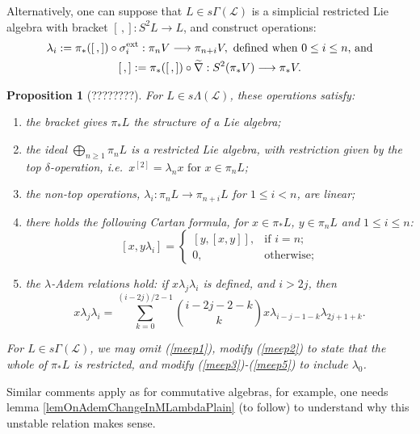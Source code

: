 \documentclass[11pt]{amsart}
\theoremstyle{plain}
\newtheorem{prop}[thm]{Proposition}
\theoremstyle{definition}
\renewcommand{\to}{\longrightarrow}
\newcommand{\scrL}{\mathscr{L}}
\theoremstyle{plain}
\newcommand{\LieOperad}{{\scrL}}
\newcommand{\restn}[1]{#1^{[2]}}
\begin{document}
\begin{Constructing homotopy and cohomotopy operations}
Alternatively, one can suppose that $L\in s \Gamma(\LieOperad)$ is a simplicial restricted Lie algebra with bracket $[\,,]:S^2L\to L$, and construct operations:
\begin{gather*}
\lambda_i:=\pi_*([\,,])\circ\sigma_i^\textup{ext}:\pi_nV\to \pi_{n+i}V,\textup{ defined when }0\leq i\leq n\textup{, and}\\
[\,,]:=\pi_*([\,,])\circ\widetilde{\nabla}:S^2(\pi_*V)\to \pi_{*}V.
\end{gather*}
\begin{prop}[????????]\label{omnibus on htpy of Lie algs}
For $L\in s\Lambda(\LieOperad)$, these operations satisfy:
\begin{enumerate}
\item \label{meep1} the bracket gives $\pi_*L$ the structure of a Lie algebra;
\item \label{meep2} the ideal $\bigoplus_{n\geq1}\pi_nL$ is a restricted Lie algebra, with restriction given by the \emph{top} $\delta$-operation, i.e.\ $\restn{x}=\lambda_nx\text{ for }x\in\pi_nL$;
\item \label{meep3} the \emph{non-top} operations, $\lambda_i:\pi_nL\to \pi_{n+i}L$ for $1\leq i<n$, are linear;
\item \label{meep4} there holds the following \emph{Cartan formula}, for $x\in \pi_*L$, $y\in \pi_nL$ and $1\leq i\leq n$:
\[[x,y\lambda_i]=\begin{cases}
[y,[x,y]],&\text{if }i=n;\\
0,&\text{otherwise};
\end{cases}
\]
\item \label{meep5} the \emph{$\lambda$-Adem relations} hold: if $x\lambda_j\lambda_i$ is defined, and $i>2j$, then
\[x\lambda_j\lambda_i=\sum_{k=0}^{(i-2j)/2-1}{i-2j-2-k\choose k}x\lambda_{i-j-1-k}\lambda_{2j+1+k}.\]
\end{enumerate}
For $L\in s\Gamma(\LieOperad)$, we may omit (\ref{meep1}), modify (\ref{meep2}) to state that the whole of $\pi_*L$ is restricted, and modify (\ref{meep3})-(\ref{meep5}) to include $\lambda_0$.
\end{prop}
Similar comments apply as for commutative algebras, for example, one needs lemma \ref{lemOnAdemChangeInMLambdaPlain} (to follow) to understand why this unstable relation makes sense. 


\end{Constructing homotopy and cohomotopy operations}
\end{document}
